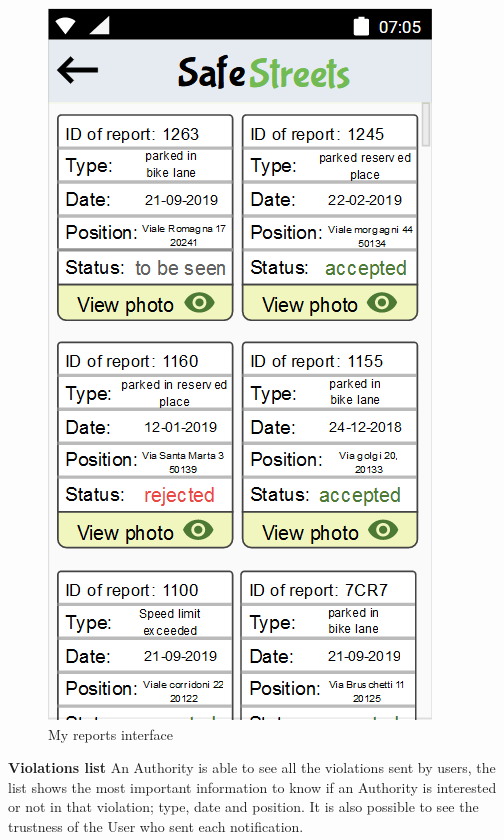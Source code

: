         \begin{figure}[h]
        \centering
        \includegraphics[scale=0.85]{Images/my_reports.png}
        \caption{My reports interface}
    \end{figure}\newpage
    \noindent\textbf{Violations list}\newline
    An Authority is able to see all the violations sent by users, the list shows the most important information to know if an Authority is interested or not in that violation; type, date and position. It is also possible to see the trustness of the User who sent each notification.\newline
